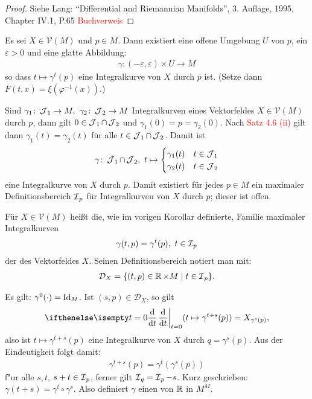 \begin{proof}
  Siehe Lang: "`Differential and Riemannian Manifolds"', 3. Auflage, 1995, Chapter IV.1, P.65 \textcolor{red}{Buchverweis}
\end{proof}

\begin{kor}
  Es sei $X \in \mathcal V(M)$ und $p \in M$. Dann existiert eine offene Umgebung $U$ von $p$, ein $\varepsilon > 0$ und eine glatte Abbildung:
  \begin{align*}
    \gamma\colon(-\varepsilon,\varepsilon) \times U \to M
  \end{align*}
so dass $t \mapsto \gamma^t(p)$ eine Integralkurve von $X$ durch $p$ ist. (Setze dann $F(t,x) = \xi(\varphi^{-1}(x))$.)
\end{kor}

\begin{kor}
Sind $\gamma_1 \colon \calJ_1 \to M, \ \gamma_2 \colon \calJ_2 \to M$ Integralkurven eines Vektorfeldes $X \in \mathcal V(M)$ durch $p$, dann gilt $0 \in \operatorname{\mathcal{J}}_1 \cap \operatorname{\mathcal{J}}_2$ und $\gamma_1(0)= p = \gamma_2(0)$.
Nach \textcolor{red}{Satz 4.6 (ii)} %
gilt dann $\gamma_1(t) = \gamma_2(t)$ für alle $t \in \operatorname{\mathcal{J}}_1 \cap \operatorname{\mathcal{J}}_2$. Damit ist
\begin{align*}
  \gamma \colon \operatorname{\mathcal{J}}_1 \cap \operatorname{\mathcal{J}}_2, \ t \mapsto 
  \begin{cases}
    \gamma_1(t) & t \in \operatorname{\mathcal{J}}_1\\
\gamma_2(t) & t \in \operatorname{\mathcal{J}}_2
  \end{cases}
\end{align*}
eine Integralkurve von $X$ durch $p$.
Damit existiert für jedes $p \in M$ ein maximaler Definitionsbereich $\operatorname{\mathcal{I}}_p$ für Integralkurven von $X$ durch $p$; dieser ist offen.
\end{kor}

\begin{dfn*}
  Für $X \in \mathcal V(M)$ heißt die, wie im vorigen Korollar definierte, Familie maximaler Integralkurven
  \begin{align*}
    \gamma(t,p) = \gamma^t(p),\ t \in \operatorname{\mathcal{I}}_p
  \end{align*}
der  des Vektorfeldes $X$.
Seinen Definitionsbereich notiert man mit:
\begin{align*}
  \mathcal D_X = \{(t,p) \in \operatorname{\mathbb{R}} \times M \mid t \in \operatorname{\mathcal{I}}_p\}.
\end{align*}
\end{dfn*}

\begin{bem*}
Es gilt: $\gamma^0(\cdot) = \operatorname{Id}_M$. Ist $(s,p) \in \mathcal D_{X}$, so gilt
	\[ \difffrac[t=0]{}{t}(t \mapsto \gamma^{t+s}(p)) = X_{\gamma^s(p)}, \]
also ist $t \mapsto \gamma^{t+s}(p)$ eine Integralkurve von $X$ durch $q = \gamma^s(p)$. Aus der Eindeutigkeit folgt damit:
\begin{align*}
  \gamma^{t+s}(p) = \gamma^t(\gamma^s(p))
\end{align*}
f"ur alle $s, t$, $s+t \in \operatorname{\mathcal{I}}_p$, ferner gilt $\operatorname{\mathcal{I}}_q = \operatorname{\mathcal{I}}_p - s$. Kurz geschrieben: $\gamma(t+s) = \gamma^t \circ \gamma^s$. Also definiert $\gamma$ einen  von $\operatorname{\mathbb{R}}$ in $M^M$.
\end{bem*}


